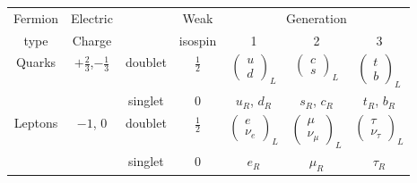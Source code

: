 \begin{tabular}{|c|c|c c|c c c|}
  \hline
  Fermion & Electric& & Weak & \multicolumn{3}{c|}{Generation}\\
  type & Charge & & isospin & 1 & 2 & 3 \\
  \hline
  \multirow{2}{*}{Quarks} & \multirow{2}{*}{$+\frac{2}{3}$,$-\frac{1}{3}$} & doublet & $\frac{1}{2}$ & $\begin{pmatrix}u\\d\end{pmatrix}_L$ & $\begin{pmatrix}c\\s\end{pmatrix}_L$ & $\begin{pmatrix}t\\b\end{pmatrix}_L$ \\
          & & singlet & 0 & $u_R$, $d_R$ & $s_R$, $c_R$ & $t_R$, $b_R$ \\
  \hline
  \multirow{2}{*}{Leptons} & \multirow{2}{*}{$-1$, $0$} & doublet & $\frac{1}{2}$ & $\begin{pmatrix}e\\ \nu_e\end{pmatrix}_L$ & $\begin{pmatrix}\mu\\ \nu_\mu\end{pmatrix}_L$ & $\begin{pmatrix}\tau\\ \nu_\tau\end{pmatrix}_L$ \\
          & & singlet & 0 & $e_R$ & $\mu_R$ & $\tau_R$ \\
  \hline
\end{tabular}